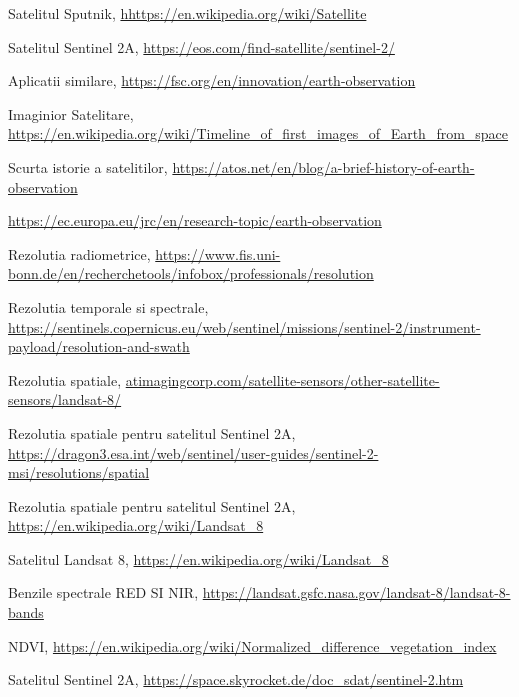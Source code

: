 \documentclass[12pt,a4paper]{article}
\theoremstyle{definition}
\theoremstyle{remark}
\begin{document}
\newpage
\begin{thebibliography}{9}
    Satelitul Sputnik,
    \url{hhttps://en.wikipedia.org/wiki/Satellite}
    
    Satelitul Sentinel 2A,
    \url{https://eos.com/find-satellite/sentinel-2/}
    
    Aplicatii similare,
    \url{https://fsc.org/en/innovation/earth-observation}
    
   Imaginior Satelitare,
    \url{https://en.wikipedia.org/wiki/Timeline_of_first_images_of_Earth_from_space}
    
   Scurta istorie a satelitilor,
    \url{https://atos.net/en/blog/a-brief-history-of-earth-observation}
    
    \url{https://ec.europa.eu/jrc/en/research-topic/earth-observation}
    
   Rezolutia radiometrice,
    \url{https://www.fis.uni-bonn.de/en/recherchetools/infobox/professionals/resolution}
    
   Rezolutia temporale si spectrale,
    \url{https://sentinels.copernicus.eu/web/sentinel/missions/sentinel-2/instrument-payload/resolution-and-swath}
    
   Rezolutia spatiale,
    \url{atimagingcorp.com/satellite-sensors/other-satellite-sensors/landsat-8/}
    
   Rezolutia spatiale pentru satelitul Sentinel 2A,
    \url{https://dragon3.esa.int/web/sentinel/user-guides/sentinel-2-msi/resolutions/spatial}
    
    
   Rezolutia spatiale pentru satelitul Sentinel 2A,
    \url{https://en.wikipedia.org/wiki/Landsat_8}
    
    
   Satelitul Landsat 8,
    \url{https://en.wikipedia.org/wiki/Landsat_8}
    
   Benzile spectrale RED SI NIR,
    \url{https://landsat.gsfc.nasa.gov/landsat-8/landsat-8-bands}
    
    NDVI,
    \url{https://en.wikipedia.org/wiki/Normalized_difference_vegetation_index}
    
   Satelitul Sentinel 2A,
    \url{https://space.skyrocket.de/doc_sdat/sentinel-2.htm}
    

\end{thebibliography}
\end{document}
